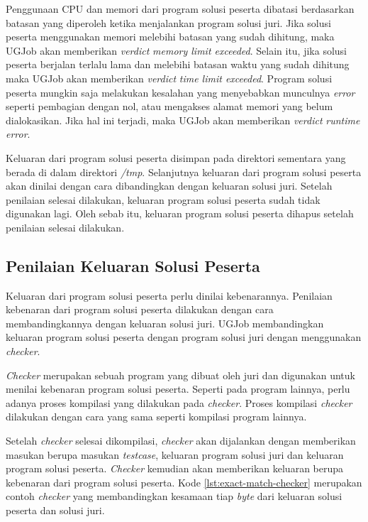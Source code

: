 \par Penggunaan CPU dan memori dari program solusi peserta dibatasi berdasarkan batasan yang diperoleh ketika menjalankan program solusi juri. Jika solusi peserta menggunakan memori melebihi batasan yang sudah dihitung, maka UGJob akan memberikan \textit{verdict} \textit{memory limit exceeded}. Selain itu, jika solusi peserta berjalan terlalu lama dan melebihi batasan waktu yang sudah dihitung maka UGJob akan memberikan \textit{verdict} \textit{time limit exceeded}. Program solusi peserta mungkin saja melakukan kesalahan yang menyebabkan munculnya \textit{error} seperti pembagian dengan nol, atau mengakses alamat memori yang belum dialokasikan. Jika hal ini terjadi, maka UGJob akan memberikan \textit{verdict} \textit{runtime error}.

\par Keluaran dari program solusi peserta disimpan pada direktori sementara yang berada di dalam direktori \textit{/tmp}. Selanjutnya keluaran dari program solusi peserta akan dinilai dengan cara dibandingkan dengan keluaran solusi juri. Setelah penilaian selesai dilakukan, keluaran program solusi peserta sudah tidak digunakan lagi. Oleh sebab itu, keluaran program solusi peserta dihapus setelah penilaian selesai dilakukan.

\subsection{Penilaian Keluaran Solusi Peserta}

\par Keluaran dari program solusi peserta perlu dinilai kebenarannya. Penilaian kebenaran dari program solusi peserta dilakukan dengan cara membandingkannya dengan keluaran solusi juri. UGJob membandingkan keluaran program solusi peserta dengan program solusi juri dengan menggunakan \textit{checker}.

\par \textit{Checker} merupakan sebuah program yang dibuat oleh juri dan digunakan untuk menilai kebenaran program solusi peserta. Seperti pada program lainnya, perlu adanya proses kompilasi yang dilakukan pada \textit{checker}. Proses kompilasi \textit{checker} dilakukan dengan cara yang sama seperti kompilasi program lainnya.



\par Setelah \textit{checker} selesai dikompilasi, \textit{checker} akan dijalankan dengan memberikan masukan berupa masukan \textit{testcase}, keluaran program solusi juri dan keluaran program solusi peserta. \textit{Checker} kemudian akan memberikan keluaran berupa kebenaran dari program solusi peserta. Kode \ref{lst:exact-match-checker} merupakan contoh \textit{checker} yang membandingkan kesamaan tiap \textit{byte} dari keluaran solusi peserta dan solusi juri.

